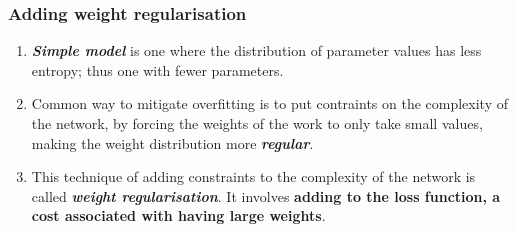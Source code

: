 \documentclass[12pt, a4paper]{article}
\begin{document}
\subsubsection{Adding weight regularisation}
\begin{enumerate}
   \item \textbf{\textit{Simple model}} is one where the distribution of parameter values has less entropy;
   thus one with fewer parameters.
   \item Common way to mitigate overfitting is to put contraints on the complexity of the network,
   by forcing the weights of the work to only take small values, making the weight distribution more 
   \textbf{\textit{regular}}.
   \item This technique of adding constraints to the complexity of the network is called 
   \textbf{\textit{weight regularisation}}. It involves \textbf{adding to the loss function, a cost associated with having large weights}.
   
\end{enumerate}
\end{document}
